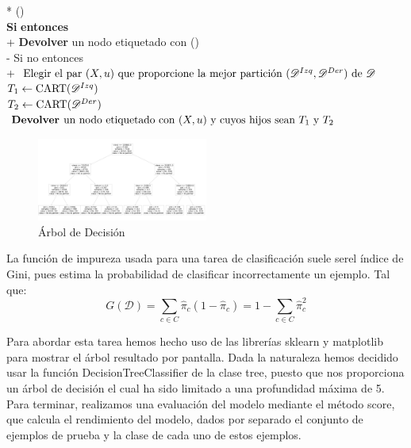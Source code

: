 \documentclass[conference,a4paper]{IEEEtran}
\begin{document}
\begin{pseudo}*
    () \\
    \textbf{Si} \textnormal{} \textbf{entonces} \\+
    \textbf{Devolver} \textnormal{un nodo etiquetado con ()} \\-
    Si no entonces \\+
    \(\textnormal{Elegir el par $(X, u)$ que proporcione la mejor partición $(\mathscr{D}^{Izq},\mathscr{D}^{Der})$ de $\mathscr{D}$}\) \\
    \( T_{1} \leftarrow \textnormal{CART($\mathscr{D}^{Izq}$)}\) \\
    \( T_{2} \leftarrow \textnormal{CART($\mathscr{D}^{Der}$)}\) \\
    \(\textbf{Devolver } \textnormal{un nodo etiquetado con ($X, u$) y cuyos hijos sean $T_{1}$  y $T_{2}$}\)\\
 \end{pseudo}



\begin{figure} %
    \centering
    \includegraphics[width=0.5\textwidth]{./ImagenesMemoria/Arbol}
    \caption{\label{fig:arbolDecision}Árbol de Decisión}
\end{figure}

 La función de impureza usada para una tarea de clasificación suele serel índice de Gini, pues estima la probabilidad de clasificar incorrectamente un ejemplo. Tal que: 
\begin{equation}
G(\mathscr{D}) = \sum_{c\in C} \hat{\pi}_c (1-  \hat{\pi}_c) = 1 -  \sum_{c\in C}  \hat{\pi}_c^2
\end{equation}

Para abordar esta tarea hemos hecho uso de las librerías sklearn y matplotlib para mostrar el árbol resultado por pantalla. Dada la naturaleza hemos decidido usar la función DecisionTreeClassifier de la clase tree, puesto que nos proporciona un árbol de decisión el cual ha sido limitado a una profundidad máxima de 5. Para terminar, realizamos una evaluación del modelo mediante el método score, que calcula el rendimiento del modelo, dados por separado el conjunto de ejemplos de prueba y la clase de cada uno de estos ejemplos.
\end{document}
